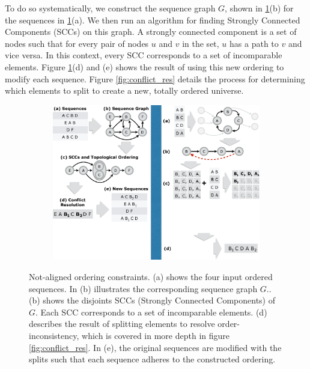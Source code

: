 To do so systematically, we construct the sequence graph $G$, shown in \ref{fig:ordering}(b) for the sequences  in \ref{fig:ordering}(a). We then run an algorithm for finding Strongly Connected Components (SCCs) on this graph. A strongly connected component is a set of nodes such that for every pair of nodes $u$ and $v$ in the set, $u$ has a path to $v$ and vice versa. In this context, every SCC corresponds to a set of incomparable elements.  Figure \ref{fig:ordering}(d) and (e) shows the result of using this new ordering to modify each sequence.  
Figure \ref{fig:conflict_res} details the process for determining which elements to split to create a new, totally ordered universe.


\begin{figure}[t!] 
\begin{minipage}{1\linewidth}
\begin{subfigure}[c]{0.96\linewidth}
\includegraphics[trim={0 6cm 19.2cm 0}, clip, width=\linewidth]{figures/partial_ordering}
\end{subfigure} 
\end{minipage} 
\caption{Not-aligned ordering constraints. (a) shows the four input ordered sequences. In (b) illustrates the corresponding sequence graph $G$.. (b) shows the disjoints SCCs  (Strongly Connected Components) of $G$. Each SCC corresponds to a set of incomparable elements. (d) describes the result of splitting elements to resolve order-inconsistency, which is covered in more depth in figure \ref{fig:conflict_res}. In (e), the original sequences are modified with the splits such that each sequence adheres to the constructed ordering.}
\label{fig:ordering}
\end{figure}



